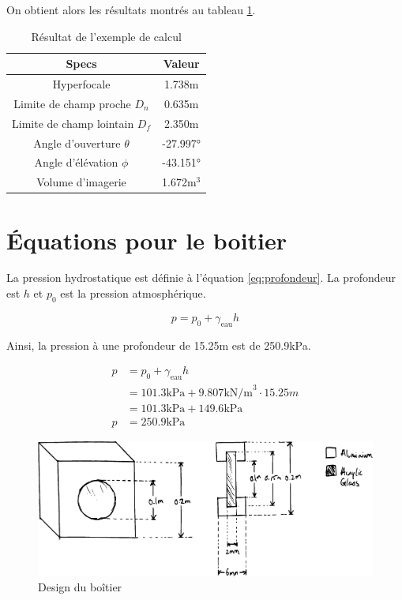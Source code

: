 On obtient alors les résultats montrés au tableau \ref{t:resultat_calcul_camera_custom}.
\begin{table}[!htb]
\footnotesize
\centering
    \begin{tabular}{|c|c|}
    \hline
    Specs & Valeur\\
    \hline\hline
    Hyperfocale & 1.738m\\
    Limite de champ proche $D_n$ & 0.635m\\
    Limite de champ lointain $D_f$ & 2.350m\\
    Angle d'ouverture $\theta$ & -27.997°\\
    Angle d'élévation $\phi$ & -43.151°\\
    Volume d'imagerie & 1.672m$^3$\\
    \hline
    \end{tabular}
\caption{Résultat de l'exemple de calcul}
\label{t:resultat_calcul_camera_custom}
\end{table}


\chapter{Équations pour le boitier}
\label{annexe:equation_boitier}

La pression hydrostatique est définie à l'équation \ref{eq:profondeur}. La profondeur est $h$ et $p_0$ est la pression atmosphérique.

\begin{equation}
    p = p_0 +\gamma_\text{eau} h
    \label{eq:profondeur}
\end{equation}

Ainsi, la pression à une profondeur de 15.25m est de 250.9kPa.

\begin{align}
    p &= p_0 +\gamma_\text{eau} h\\
    &= 101.3\text{kPa} + 9.807\text{kN/m}^3 \cdot 15.25m\\
    &= 101.3\text{kPa} + 149.6\text{kPa}\\
    p &= 250.9\text{kPa}
\end{align}


\begin{figure}[!htb]
    \centering
    \includegraphics[width=0.85\linewidth]{fig/camera_custom_boitier_vect.png}
    \caption{Design du boîtier}
    \label{fig:boitier_camera_custom}
\end{figure}

